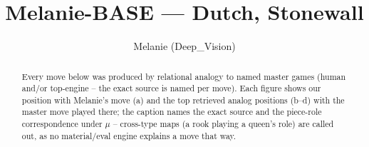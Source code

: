 \documentclass[11pt]{article}
\title{Melanie-BASE — Dutch, Stonewall}
\author{Melanie (Deep\_Vision)}
\date{}
\begin{document}
\maketitle

\begin{abstract}Every move below was produced by relational analogy to named master games (human and/or top-engine -- the exact source is named per move). Each figure shows our position with Melanie's move (a) and the top retrieved analog positions (b--d) with the master move played there; the caption names the exact source and the piece-role correspondence under $\mu$ -- cross-type maps (a rook playing a queen's role) are called out, as no material/eval engine explains a move that way.\end{abstract}

\begin{figure}[p]\centering
\begin{subfigure}{0.46\textwidth}\centering
\resizebox{\linewidth}{!}{%
\newchessgame
\chessboard[
  setfen={rnbqk2r/pp4pp/2pbpn2/3p1p2/2PP4/5NP1/PP2PPBP/RNBQ1RK1 w kq - 0 7},
  showmover=false,
  pgfstyle=straightmove, color=movearrow, markmove={c4-d5}
]}
\caption{}
\end{subfigure}\hfill
\begin{subfigure}{0.46\textwidth}\centering
\resizebox{\linewidth}{!}{%
\newchessgame
\chessboard[
  setfen={1nbqk2r/1p3ppp/r2bpn2/p7/1pPP4/P4NP1/5PBP/RNBQ1RK1 w k - 4 11},
  showmover=false,
  pgfstyle=straightmove, color=movearrow, markmove={a3-b4}
]}
\caption{}
\end{subfigure}
\\[4pt]
\begin{subfigure}{0.46\textwidth}\centering
\resizebox{\linewidth}{!}{%
\newchessgame
\chessboard[
  setfen={rnbq1rk1/pp2ppbp/3p1np1/2p5/3PP3/2P2N1P/PPB2PP1/RNBQK2R b KQ - 0 7},
  showmover=false,
  pgfstyle=straightmove, color=movearrow, markmove={c5-d4}
]}
\caption{}
\end{subfigure}\hfill
\begin{subfigure}{0.46\textwidth}\centering
\resizebox{\linewidth}{!}{%
\newchessgame
\chessboard[
  setfen={rnbq1rk1/pp2ppbp/3p1np1/2p5/3PP3/2P2N1P/PPB2PP1/RNBQK2R b KQ - 0 7},
  showmover=false,
  pgfstyle=straightmove, color=movearrow, markmove={c5-d4}
]}
\caption{}
\end{subfigure}

\end{figure}
\end{document}
